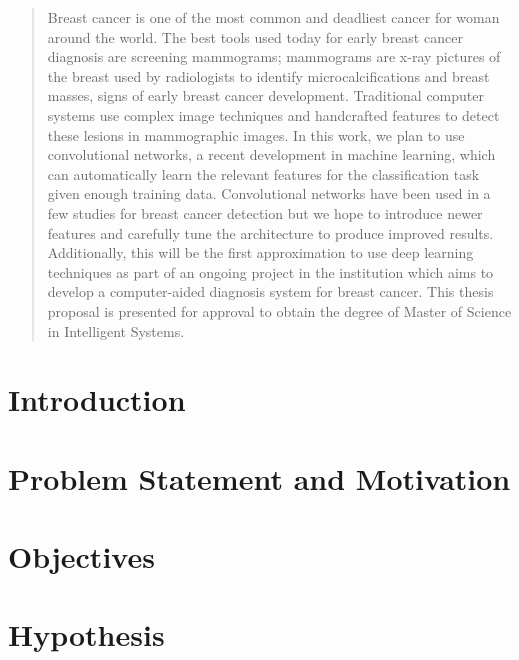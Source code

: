 \documentclass[11pt]{article}
\begin{document}
\propportada                        %
\proppagfirmas                      %
\thispagestyle{empty}
\tableofcontents                    %
\newpage
\sloppy
\newpage
{}

\begin{abstract}
Breast cancer is one of the most common and deadliest cancer for woman around the world. The best tools used today for early breast cancer diagnosis are screening mammograms; mammograms are x-ray pictures of the breast used by radiologists to identify microcalcifications and breast masses, signs of early breast cancer development. Traditional computer systems use complex image techniques and handcrafted features to detect these lesions in mammographic images. In this work, we plan to use convolutional networks, a recent development in machine learning, which can automatically learn the relevant features for the classification task given enough training data. Convolutional networks have been used in a few studies for breast cancer detection but we hope to introduce newer features and carefully tune the architecture to produce improved results. Additionally, this will be the first approximation to use deep learning techniques as part of an ongoing project in the institution which aims to develop a computer-aided diagnosis system for breast cancer. This thesis proposal is presented for approval to obtain the degree of Master of Science in Intelligent Systems.
\end{abstract}

\section{Introduction}


\section{Problem Statement and Motivation}
\label{sec:ProblemDefinition}


\section{Objectives}
\label{sec:Objectives}


\section{Hypothesis}
\label{sec:Hypothesis}

\end{document}

